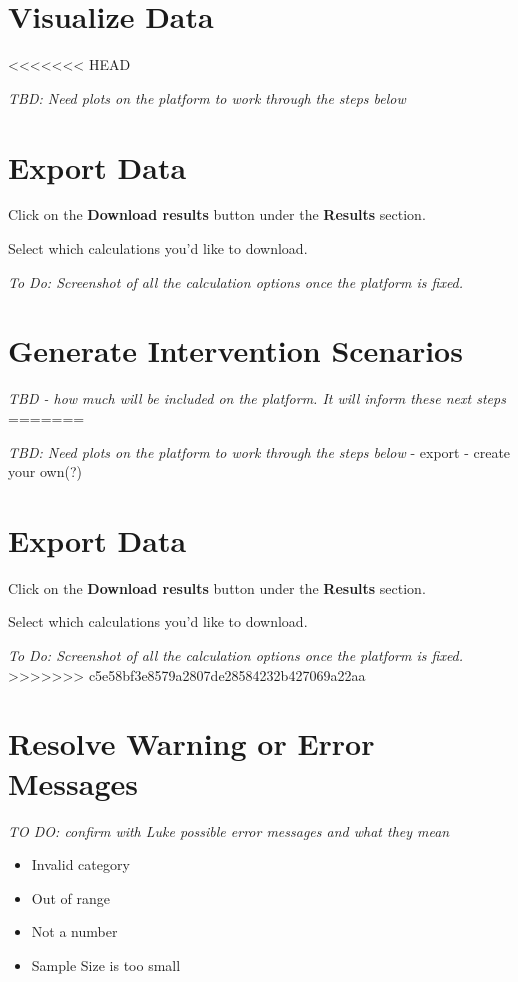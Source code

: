 \documentclass[]{book}
\providecommand{\tightlist}{%
  \setlength{\itemsep}{0pt}\setlength{\parskip}{0pt}}
\begin{document}
\section{Visualize Data}\label{visualize-data}
<<<<<<< HEAD

\emph{TBD: Need plots on the platform to work through the steps below}

\section{Export Data}\label{export-data}

Click on the \textbf{Download results} button under the \textbf{Results}
section.

Select which calculations you'd like to download.

\emph{To Do: Screenshot of all the calculation options once the platform
is fixed.}

\section{Generate Intervention
Scenarios}\label{generate-intervention-scenarios-1}

\emph{TBD - how much will be included on the platform. It will inform
these next steps}
=======

\emph{TBD: Need plots on the platform to work through the steps below} -
export - create your own(?)

\section{Export Data}\label{export-data}

Click on the \textbf{Download results} button under the \textbf{Results}
section.

Select which calculations you'd like to download.

\emph{To Do: Screenshot of all the calculation options once the platform
is fixed.}
>>>>>>> c5e58bf3e8579a2807de28584232b427069a22aa

\section{Resolve Warning or Error
Messages}\label{resolve-warning-or-error-messages}

\emph{TO DO: confirm with Luke possible error messages and what they
mean}

\begin{itemize}
\tightlist
\item
  Invalid category
\item
  Out of range
\item
  Not a number
\item
  Sample Size is too small
\end{itemize}
\end{document}
